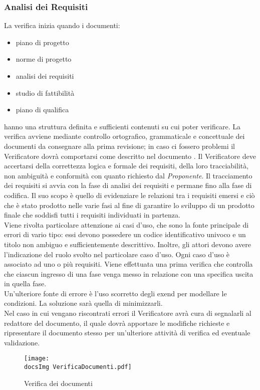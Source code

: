 {{	\subsubsection{Analisi dei Requisiti}{
		La verifica inizia quando i documenti:
			\begin{itemize}
				\item piano di progetto
				\item norme di progetto
				\item analisi dei requisiti
				\item studio di fattibilità
				\item piano di qualifica
			\end{itemize}
		hanno una struttura definita e sufficienti contenuti su cui poter verificare.
		La verifica avviene mediante controllo ortografico, grammaticale e concettuale dei documenti da consegnare alla prima revisione; 
		in caso ci fossero problemi il Verificatore dovrà comportarsi come descritto nel documento \textit{\NormeDiProgetto}.
		Il Verificatore deve accertarsi della correttezza logica e formale dei requisiti, della loro tracciabilità, non ambiguità e
		conformità con quanto richiesto dal \textit{Proponente}. Il tracciamento dei requisiti si avvia con la fase di analisi dei 
		requisiti e permane fino alla fase di codifica. Il suo scopo è quello di evidenziare le relazioni tra i requisiti emersi e ciò 
		che è stato prodotto nelle varie fasi al fine di garantire lo sviluppo di un prodotto finale che soddisfi tutti i requisiti 
		individuati in partenza.\\
		Viene rivolta particolare attenzione ai casi d’uso, che sono la fonte principale di errori di vario tipo: essi devono possedere un 
		codice identificativo univoco e un titolo non ambiguo e sufficientemente descrittivo. Inoltre, gli attori devono avere 
		l’indicazione del ruolo svolto nel particolare caso d’uso. Ogni caso d’uso è associato ad uno o più requisiti. 
		Viene effettuata una prima verifica che controlla che ciascun ingresso di una fase venga messo in relazione con una specifica 
		uscita in quella fase.\\
		Un'ulteriore fonte di errore è l’uso scorretto degli exend per modellare le condizioni. La soluzione sarà quella di minimizzarli.\\
		Nel caso in cui vengano riscontrati errori il Verificatore avrà cura di segnalarli al redattore del documento, il quale dovrà 
		apportare le modifiche richieste e ripresentare il documento stesso per un'ulteriore attività di verifica ed eventuale validazione.
		\begin{figure}[h!]
			\centering
			\texttt{[image: \\docsImg VerificaDocumenti.pdf]}
			\caption{Verifica dei documenti}
		\end{figure}

}}}
